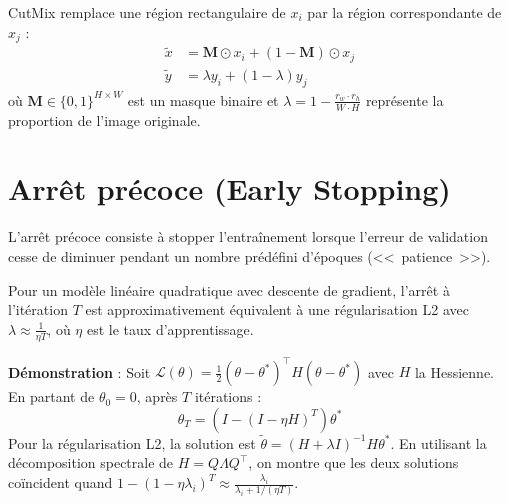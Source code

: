 \begin{formules}[title=\textbf{CutMix}]
CutMix \cite{yun2019cutmix} remplace une r\'egion rectangulaire de $x_i$ par
la r\'egion correspondante de $x_j$ :
\begin{align}
\tilde{x} &= \mathbf{M} \odot x_i + (1 - \mathbf{M}) \odot x_j \\
\tilde{y} &= \lambda y_i + (1 - \lambda) y_j
\end{align}
o\`u $\mathbf{M} \in \{0, 1\}^{H \times W}$ est un masque binaire et
$\lambda = 1 - \frac{r_w \cdot r_h}{W \cdot H}$ repr\'esente la proportion
de l'image originale.
\end{formules}

\section{Arr\^et pr\'ecoce (Early Stopping)}
\label{sec:early-stopping}

\begin{definition}
L'arr\^et pr\'ecoce consiste \`a stopper l'entra\^inement lorsque l'erreur de
validation cesse de diminuer pendant un nombre pr\'ed\'efini d'\'epoques
(<<~patience~>>).
\end{definition}

\begin{theoreme}
Pour un mod\`ele lin\'eaire quadratique avec descente de gradient, l'arr\^et
\`a l'it\'eration $T$ est approximativement \'equivalent \`a une
r\'egularisation L2 avec $\lambda \approx \frac{1}{\eta T}$, o\`u $\eta$ est
le taux d'apprentissage.

\textbf{D\'emonstration} : Soit $\mathcal{L}(\theta) = \frac{1}{2}(\theta - \theta^*)^\top H (\theta - \theta^*)$
avec $H$ la Hessienne. En partant de $\theta_0 = 0$, apr\`es $T$ it\'erations :
\begin{equation}
\theta_T = (I - (I - \eta H)^T) \theta^*
\end{equation}
Pour la r\'egularisation L2, la solution est
$\tilde{\theta} = (H + \lambda I)^{-1} H \theta^*$.
En utilisant la d\'ecomposition spectrale de $H = Q \Lambda Q^\top$, on
montre que les deux solutions co\"incident quand
$1 - (1 - \eta \lambda_i)^T \approx \frac{\lambda_i}{\lambda_i + 1/(\eta T)}$.
\end{theoreme}

